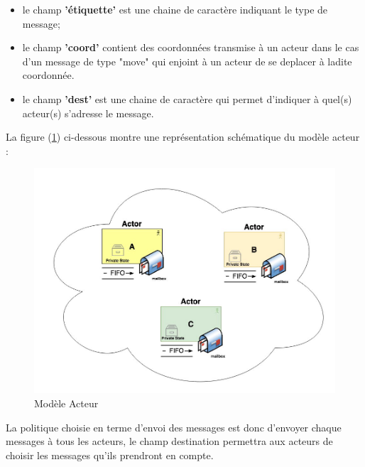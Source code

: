 \documentclass[a4paper,10pt]{article}
\begin{document}
\begin{itemize}
    \item le champ \textbf{'étiquette'} est une chaine de caractère indiquant le type de message;\\
    \item le champ \textbf{'coord'} contient des coordonnées transmise à un acteur dans le cas d'un message de type "move" qui enjoint à un acteur de se deplacer à ladite coordonnée.\\
    \item le champ \textbf{'dest'} est une chaine de caractère qui permet d'indiquer à quel(s) acteur(s) s'adresse le message.\\
\end{itemize}
La figure (\ref{fig:act}) ci-dessous montre une représentation schématique du modèle acteur :

\begin{figure}[h]
\begin{center}
    \includegraphics[scale=0.3]{actor.jpeg}
        \caption{Modèle Acteur}
    \label{fig:act}
\end{center}
\end{figure}

La politique choisie en terme d'envoi des messages est donc d'envoyer chaque messages à tous les acteurs, le champ destination permettra aux acteurs de choisir les messages qu'ils prendront en compte.
\end{document}
